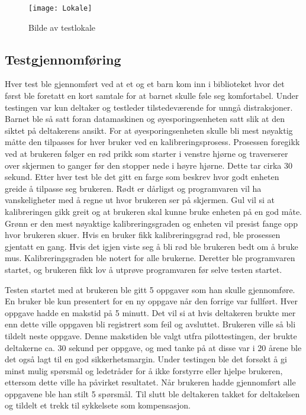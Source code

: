  
\begin{figure}[ht!] 
\centering 
\texttt{[image: Lokale]} 
\caption{Bilde av testlokale} 
\label{fig:test_lokale} 
\end{figure} 
 
 
 
 
\subsection{Testgjennomføring} 
Hver test ble gjennomført ved at et og et barn kom inn i biblioteket hvor det først ble foretatt en kort 
samtale for at barnet skulle føle seg komfortabel. Under testingen var kun deltaker og testleder 
tilstedeværende for unngå distraksjoner. Barnet ble så satt foran datamaskinen og øyesporingsenheten satt slik at den siktet på deltakerens ansikt. For at øyesporingsenheten skulle bli mest nøyaktig måtte den tilpasses for hver bruker ved 
en kalibreringsprosess. Prosessen foregikk ved at brukeren følger en rød prikk som starter i 
venstre hjørne og traverserer over skjermen to ganger før den stopper nede i høyre hjørne. Dette 
tar cirka 30 sekund. Etter hver test ble det gitt en farge som beskrev hvor godt enheten greide å 
tilpasse seg brukeren. Rødt er dårligst og programvaren vil ha vanskeligheter med å regne ut hvor 
brukeren ser på skjermen. Gul vil si at kalibreringen gikk greit og at brukeren skal kunne bruke 
enheten på en god måte. Grønn er den mest nøyaktige kalibreringsgraden og enheten vil presist 
fange opp hvor brukeren skuer. Hvis en bruker fikk kalibreringsgrad rød, ble prosessen gjentatt en 
gang. Hvis det igjen viste seg å bli rød ble brukeren bedt om å bruke mus. Kalibreringsgraden ble 
notert for alle brukerne. Deretter ble programvaren startet, og brukeren fikk lov å utprøve programvaren før selve testen startet. 
 
 
Testen startet med at brukeren ble  gitt 5 oppgaver som han skulle gjennomføre. En bruker ble kun presentert for en ny oppgave når den forrige var fullført. Hver oppgave hadde en makstid på 5 minutt. Det vil si at hvis deltakeren brukte mer enn dette ville oppgaven bli registrert som feil og avsluttet. Brukeren ville så bli tildelt neste oppgave. Denne makstiden ble valgt utfra pilottestingen, der brukte deltakerne ca. 30 sekund per oppgave, og med tanke på at disse var i 20 årene ble det også lagt til en god sikkerhetsmargin. Under testingen ble det forsøkt å gi minst mulig spørsmål og ledetråder for å ikke forstyrre eller hjelpe brukeren, ettersom dette ville ha påvirket resultatet. Når brukeren hadde gjennomført alle oppgavene ble han stilt 5 spørsmål. Til slutt ble deltakeren takket for deltakelsen og tildelt et trekk til sykkelsete som kompensasjon. 
 
